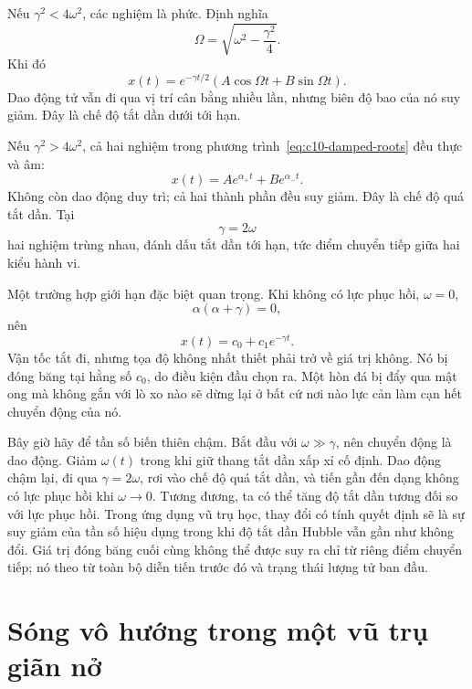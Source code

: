 Nếu \(\gamma^2<4\omega^2\), các nghiệm là phức. Định nghĩa
\[
\Omega=\sqrt{\omega^2-\frac{\gamma^2}{4}}.
\]
Khi đó
\begin{equation}
x(t)=e^{-\gamma t/2}
\left(A\cos\Omega t+B\sin\Omega t\right).
\label{eq:c10-underdamped}
\end{equation}
Dao động tử vẫn đi qua vị trí cân bằng nhiều lần, nhưng biên độ bao của nó suy giảm. Đây là chế độ tắt dần dưới tới hạn.

Nếu \(\gamma^2>4\omega^2\), cả hai nghiệm trong phương trình~\eqref{eq:c10-damped-roots} đều thực và âm:
\begin{equation}
x(t)=A e^{\alpha_+t}+B e^{\alpha_-t}.
\label{eq:c10-overdamped}
\end{equation}
Không còn dao động duy trì; cả hai thành phần đều suy giảm. Đây là chế độ quá tắt dần. Tại
\begin{equation}
\gamma=2\omega
\label{eq:c10-critical}
\end{equation}
hai nghiệm trùng nhau, đánh dấu tắt dần tới hạn, tức điểm chuyển tiếp giữa hai kiểu hành vi.

Một trường hợp giới hạn đặc biệt quan trọng. Khi không có lực phục hồi, \(\omega=0\),
\[
\alpha(\alpha+\gamma)=0,
\]
nên
\begin{equation}
x(t)=c_0+c_1e^{-\gamma t}.
\label{eq:c10-no-restoring}
\end{equation}
Vận tốc tắt đi, nhưng tọa độ không nhất thiết phải trở về giá trị không. Nó bị đóng băng tại hằng số \(c_0\), do điều kiện đầu chọn ra. Một hòn đá bị đẩy qua mật ong mà không gắn với lò xo nào sẽ dừng lại ở bất cứ nơi nào lực cản làm cạn hết chuyển động của nó.

Bây giờ hãy để tần số biến thiên chậm. Bắt đầu với \(\omega\gg\gamma\), nên chuyển động là dao động. Giảm \(\omega(t)\) trong khi giữ thang tắt dần xấp xỉ cố định. Dao động chậm lại, đi qua \(\gamma=2\omega\), rơi vào chế độ quá tắt dần, và tiến gần đến dạng không có lực phục hồi khi \(\omega\to0\). Tương đương, ta có thể tăng độ tắt dần tương đối so với lực phục hồi. Trong ứng dụng vũ trụ học, thay đổi có tính quyết định sẽ là sự suy giảm của tần số hiệu dụng trong khi độ tắt dần Hubble vẫn gần như không đổi. Giá trị đóng băng cuối cùng không thể được suy ra chỉ từ riêng điểm chuyển tiếp; nó theo từ toàn bộ diễn tiến trước đó và trạng thái lượng tử ban đầu.

\section{Sóng vô hướng trong một vũ trụ giãn nở}

